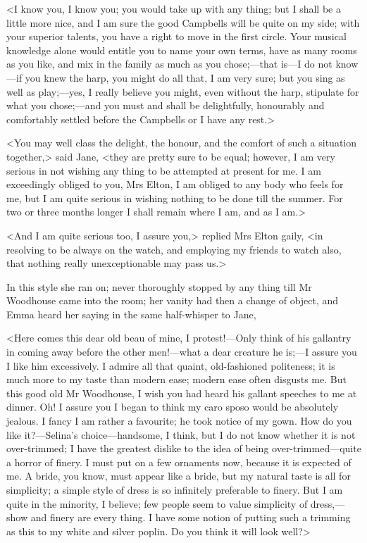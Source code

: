 <I know you, I know you; you would take up with any thing; but I shall be a little more nice, and I am sure the good Campbells will be quite on my side; with your superior talents, you have a right to move in the first circle. Your musical knowledge alone would entitle you to name your own terms, have as many rooms as you like, and mix in the family as much as you chose;—that is—I do not know—if you knew the harp, you might do all that, I am very sure; but you sing as well as play;—yes, I really believe you might, even without the harp, stipulate for what you chose;—and you must and shall be delightfully, honourably and comfortably settled before the Campbells or I have any rest.>

<You may well class the delight, the honour, and the comfort of such a situation together,> said Jane, <they are pretty sure to be equal; however, I am very serious in not wishing any thing to be attempted at present for me. I am exceedingly obliged to you, Mrs Elton, I am obliged to any body who feels for me, but I am quite serious in wishing nothing to be done till the summer. For two or three months longer I shall remain where I am, and as I am.>

<And I am quite serious too, I assure you,> replied Mrs Elton gaily, <in resolving to be always on the watch, and employing my friends to watch also, that nothing really unexceptionable may pass us.>

In this style she ran on; never thoroughly stopped by any thing till Mr Woodhouse came into the room; her vanity had then a change of object, and Emma heard her saying in the same half-whisper to Jane,

<Here comes this dear old beau of mine, I protest!—Only think of his gallantry in coming away before the other men!—what a dear creature he is;—I assure you I like him excessively. I admire all that quaint, old-fashioned politeness; it is much more to my taste than modern ease; modern ease often disgusts me. But this good old Mr Woodhouse, I wish you had heard his gallant speeches to me at dinner. Oh! I assure you I began to think my caro sposo would be absolutely jealous. I fancy I am rather a favourite; he took notice of my gown. How do you like it?—Selina's choice—handsome, I think, but I do not know whether it is not over-trimmed; I have the greatest dislike to the idea of being over-trimmed—quite a horror of finery. I must put on a few ornaments now, because it is expected of me. A bride, you know, must appear like a bride, but my natural taste is all for simplicity; a simple style of dress is so infinitely preferable to finery. But I am quite in the minority, I believe; few people seem to value simplicity of dress,—show and finery are every thing. I have some notion of putting such a trimming as this to my white and silver poplin. Do you think it will look well?>


